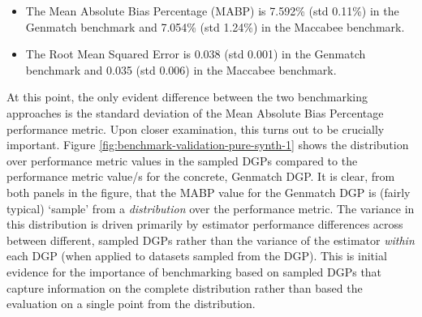 \documentclass[../main.tex]{subfiles}
\begin{document}
\begin{itemize}
    \item The Mean Absolute Bias Percentage (MABP) is 7.592\% (std 0.11\%) in the Genmatch benchmark and 7.054\% (std 1.24\%) in the Maccabee benchmark.
    
    \item The Root Mean Squared Error is 0.038 (std 0.001) in the Genmatch benchmark and 0.035 (std 0.006) in the Maccabee benchmark.
\end{itemize}

At this point, the only evident difference between the two benchmarking approaches is the standard deviation of the Mean Absolute Bias Percentage performance metric. Upon closer examination, this turns out to be crucially important. Figure \ref{fig:benchmark-validation-pure-synth-1} shows the distribution over performance metric values in the sampled DGPs compared to the performance metric value/s for the concrete, Genmatch DGP. It is clear, from both panels in the figure, that the MABP value for the Genmatch DGP is (fairly typical) `sample' from a \textit{distribution} over the performance metric. The variance in this distribution is driven primarily by estimator performance differences across between different, sampled DGPs rather than the variance of the estimator \textit{within} each DGP (when applied to datasets sampled from the DGP). This is initial evidence for the importance of benchmarking based on sampled DGPs that capture information on the complete distribution rather than based the evaluation on a single point from the distribution.

\vspace{\baselineskip}
\end{document}
